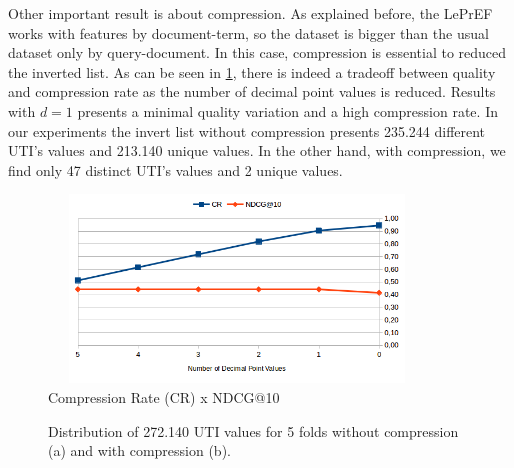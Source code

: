 \documentclass[preprint,12pt,3p]{elsarticle}
\begin{document}
Other important result is about compression. As explained before, the LePrEF works with features by document-term, so the dataset is bigger than the usual dataset only by query-document. In this case, compression is essential to reduced the inverted list. As can be seen in \ref{fig:crq}, there is indeed a tradeoff between quality and compression rate as the number of decimal point values is reduced. Results with $d=1$ presents a minimal quality variation and a high compression rate. In our experiments the invert list without compression presents 235.244 different UTI's values and 213.140 unique values. In the other hand, with compression, we find only 47 distinct UTI's values and 2 unique values. 

\begin{figure}[h!]
\begin{center}
\includegraphics[width=10cm, height=5cm]{im_cr_ndcg_lambda.png}
\caption{Compression Rate (CR) x NDCG@10}
\label{fig:crq}
\end{center}
\end{figure}

\begin{figure}[h!]
\centering
	\caption{Distribution of 272.140 UTI values for 5 folds without compression (a) and with compression (b).}
	\label{fig:compareData}
\end{figure}
\end{document}
